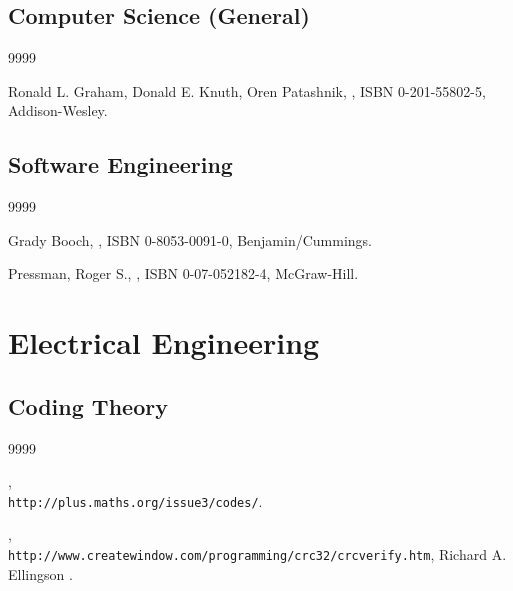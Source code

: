 \subsection*{Computer Science (General)}

\begin{thecustombibliography}{9999}

Ronald L. Graham,
Donald E. Knuth,
Oren Patashnik,
,
ISBN 0-201-55802-5, Addison-Wesley.

\end{thecustombibliography}


\subsection*{Software Engineering}

\begin{thecustombibliography}{9999}

Grady Booch, 
,
ISBN 0-8053-0091-0, Benjamin/Cummings.

Pressman, Roger S., 
,
ISBN 0-07-052182-4, McGraw-Hill.

\end{thecustombibliography}




\section*{Electrical Engineering}

\subsection*{Coding Theory}

\begin{thecustombibliography}{9999}

, \\
\texttt{http://plus.maths.org/issue3/codes/}.

, \\
\texttt{http://www.createwindow.com/programming/crc32/crcverify.htm},
Richard A. Ellingson \cite{bibref:i:richardaellingson}.

\end{thecustombibliography}

